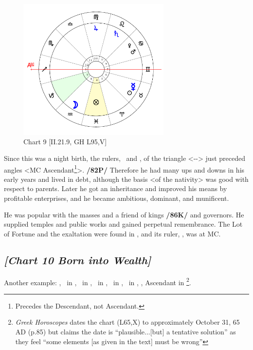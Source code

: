 \clearpage
\begin{figure}
\centering
\vspace{-20pt}
\includegraphics[width=0.68\textwidth]{charts/2_21_9}
\caption{Chart 9 [II.21.9, GH L95,V]}
\label{fig:chart09}
\end{figure}

Since this was a night birth, the rulers, \Saturn\, and \Mercury, of the triangle <\Gemini-\Libra-\Aquarius> just preceded angles <MC Ascendant\footnote{Precedes the Descendant, not Ascendant.}>. \textbf{/82P/} Therefore he had many ups and downs in his early years and lived in debt, although the basis <of the nativity> was good
with respect to parents. Later he got an inheritance and improved his means by profitable enterprises, and he became ambitious, dominant, and munificent. 

He was popular with the masses and a friend of kings \textbf{/86K/} and governors. He supplied temples and public works and gained perpetual remembrance. The Lot of Fortune and the exaltation were found in \Pisces, and its ruler, \Jupiter, was at MC.
\newpage
\subsection*{\textit{[Chart 10 Born into Wealth]}}

Another example: \Sun, \Mercury\, in \Scorpio, \Moon\, in \Aries, \Saturn\, in \Virgo, \Jupiter\, in \Pisces, \Mars\, in \Leo, \Venus, Ascendant in \Sagittarius
\footnote{\textit{Greek Horoscopes} dates the chart (L65,X) to approximately October 31, 65 AD (p.85) but claims the date is ``plausible...[but] a tentative solution'' as they feel ``some elements [as given in the text] must be wrong''}.

